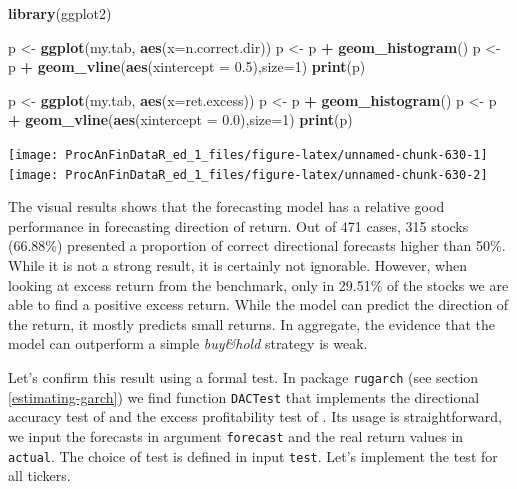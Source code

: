 \documentclass[11pt,]{book}
\newenvironment{Shaded}{\begin{snugshade}}{\end{snugshade}}
\newcommand{\KeywordTok}[1]{\textcolor[rgb]{0.27,0.27,0.27}{\textbf{#1}}}
\newcommand{\DataTypeTok}[1]{\textcolor[rgb]{0.27,0.27,0.27}{#1}}
\newcommand{\DecValTok}[1]{\textcolor[rgb]{0.06,0.06,0.06}{#1}}
\newcommand{\FloatTok}[1]{\textcolor[rgb]{0.06,0.06,0.06}{#1}}
\newcommand{\StringTok}[1]{\textcolor[rgb]{0.5,0.5,0.5}{#1}}
\newcommand{\OperatorTok}[1]{\textcolor[rgb]{0.81,0.36,0.00}{\textbf{#1}}}
\newcommand{\NormalTok}[1]{#1}
\begin{document}
\begin{Shaded}
\begin{Highlighting}[]
\KeywordTok{library}\NormalTok{(ggplot2)}

\NormalTok{p <-}\StringTok{ }\KeywordTok{ggplot}\NormalTok{(my.tab, }\KeywordTok{aes}\NormalTok{(}\DataTypeTok{x=}\NormalTok{n.correct.dir))}
\NormalTok{p <-}\StringTok{ }\NormalTok{p }\OperatorTok{+}\StringTok{ }\KeywordTok{geom_histogram}\NormalTok{()}
\NormalTok{p <-}\StringTok{ }\NormalTok{p }\OperatorTok{+}\StringTok{ }\KeywordTok{geom_vline}\NormalTok{(}\KeywordTok{aes}\NormalTok{(}\DataTypeTok{xintercept =}  \FloatTok{0.5}\NormalTok{),}\DataTypeTok{size=}\DecValTok{1}\NormalTok{)}
\KeywordTok{print}\NormalTok{(p)}

\NormalTok{p <-}\StringTok{ }\KeywordTok{ggplot}\NormalTok{(my.tab, }\KeywordTok{aes}\NormalTok{(}\DataTypeTok{x=}\NormalTok{ret.excess))}
\NormalTok{p <-}\StringTok{ }\NormalTok{p }\OperatorTok{+}\StringTok{ }\KeywordTok{geom_histogram}\NormalTok{()}
\NormalTok{p <-}\StringTok{ }\NormalTok{p }\OperatorTok{+}\StringTok{ }\KeywordTok{geom_vline}\NormalTok{(}\KeywordTok{aes}\NormalTok{(}\DataTypeTok{xintercept =}  \FloatTok{0.0}\NormalTok{),}\DataTypeTok{size=}\DecValTok{1}\NormalTok{)}
\KeywordTok{print}\NormalTok{(p)}
\end{Highlighting}
\end{Shaded}

\begin{center}\texttt{[image: ProcAnFinDataR\_ed\_1\_files/figure-latex/unnamed-chunk-630-1]} \texttt{[image: ProcAnFinDataR\_ed\_1\_files/figure-latex/unnamed-chunk-630-2]} \end{center}

The visual results shows that the forecasting model has a relative good
performance in forecasting direction of return. Out of 471 cases, 315
stocks (66.88\%) presented a proportion of correct directional forecasts
higher than 50\%. While it is not a strong result, it is certainly not
ignorable. However, when looking at excess return from the benchmark,
only in 29.51\% of the stocks we are able to find a positive excess
return. While the model can predict the direction of the return, it
mostly predicts small returns. In aggregate, the evidence that the model
can outperform a simple \emph{buy\&hold} strategy is weak.

Let's confirm this result using a formal test. In package
\texttt{rugarch} (see section \ref{estimating-garch}) we find function
\texttt{DACTest} that implements the directional accuracy test of
\citet{pesaran1992simple} and the excess profitability test of
\citet{anatolyev2005trading}. Its usage is straightforward, we input the
forecasts in argument \texttt{forecast} and the real return values in
\texttt{actual}. The choice of test is defined in input \texttt{test}.
Let's implement the test for all tickers. 
\end{document}

